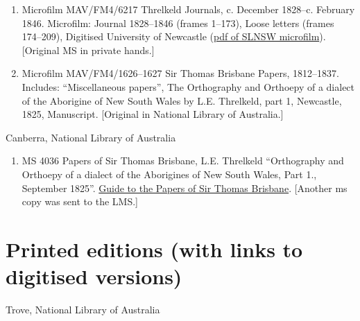 \begin{enumerate}
    \item Microfilm MAV/FM4/6217 Threlkeld Journals, c. December 1828--c. February 1846. Microfilm: Journal 1828--1846 (frames 1--173), Loose letters (frames 174--209), Digitised University of Newcastle (\href{https://hunterlivinghistories.com/2008/02/20/lost-threlkeld-manuscript-online/}{pdf of SLNSW microfilm}). \linebreak{}[Original MS in private hands.]
    \item Microfilm MAV/FM4/1626--1627 Sir Thomas Brisbane Papers, 1812--1837. Includes: “Miscellaneous papers”, The Orthography and Orthoepy of a dialect of the Aborigine of New South Wales by L.E. Threlkeld, part 1, Newcastle, 1825, Manuscript. [Original in National Library of Australia.]
\end{enumerate}

Canberra, National Library of Australia

\begin{enumerate}
    \item MS 4036 Papers of Sir Thomas Brisbane, L.E. Threlkeld “Orthography and Orthoepy of a dialect of the Aborigines of New South Wales, Part 1., Sep\-tember 1825”. \href{http://nla.gov.au/nla.obj-233244754/findingaid#nla-obj-426047906}{Guide to the Papers of Sir Thomas Brisbane}. [Another ms copy was sent to the LMS.]
\end{enumerate}

\newpage

\section*{Printed editions (with links to digitised versions)}

Trove, National Library of Australia

